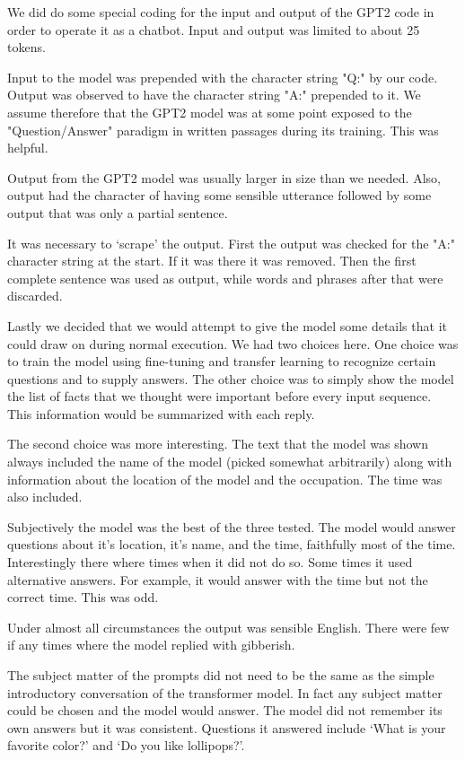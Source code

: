 We did do some special coding for the input and output of the GPT2 code in order to operate it as
a chatbot. Input and output was limited to about 25 tokens. 

Input to the model was prepended with the character string "Q:" by our code. Output was observed 
to have the character string "A:" prepended to it. We assume therefore that the GPT2 model was at some point
exposed to the "Question/Answer" paradigm in written passages during its training. This was helpful.

Output from the GPT2 model was 
usually larger in size than we needed. Also, output had the character of having some sensible utterance followed by some output that was only a partial sentence.

It was necessary to `scrape' the output. First the output was checked for the "A:" character string at the start. If it was there it was removed. Then the first complete sentence was used as output, while words and phrases after that were discarded.

Lastly we decided that we would attempt to give the model some details that it could draw on 
during normal execution. We had two choices here. One choice was to train the model using fine-tuning and transfer learning to recognize certain questions and to supply answers. The other
choice was to simply show the model the list of facts that we thought were important before 
every input sequence. This information would be summarized with each reply.

The second choice was more interesting. The text that the model was shown always included the name of 
the model (picked somewhat arbitrarily) along with information about the location of the model
and the occupation. The time was also included.

Subjectively the model was the best of the three tested. The model would answer questions about it's location, it's name, and the time, faithfully most
of the time. Interestingly there where times when it did not do so. Some times it used 
alternative answers. For example, it would answer with the time but not the correct time. This was odd.

Under almost all circumstances the output was sensible English. There were few if any times 
where the model replied with gibberish. 

The subject matter of the prompts did not need to be the
same as the simple introductory conversation of the transformer model. In fact any subject matter
could be chosen and the model would answer. The model did not remember its own answers but it
was consistent. Questions it answered include `What is your favorite color?' and `Do you like lollipops?'. 

